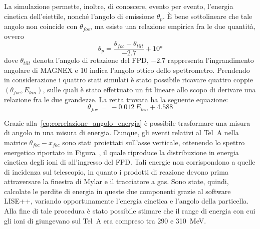 La simulazione permette, inoltre, di conoscere, evento per evento, l'energia cinetica dell'eiettile, nonché l'angolo di emissione $\theta_{p}$.
È bene sottolineare che tale angolo non coincide con $\theta_{foc}$, ma esiste una relazione empirica fra le due quantità, ovvero
\begin{equation}
	\theta_{p} = \frac{\theta_{foc} - \theta_{tilt}}{-2.7} + \ang{10}
\end{equation}
dove $\theta_{tilt}$ denota l'angolo di rotazione del FPD, $-2.7$ rappresenta l'ingrandimento angolare di MAGNEX e 10\textdegree{} indica l'angolo ottico dello spettrometro.
Prendendo in considerazione i quattro stati simulati è stato possibile ricavare quattro coppie $(\theta_{foc} , E_{kin})$, sulle quali è stato effettuato un fit lineare allo scopo di derivare una relazione fra le due grandezze.
La retta trovata ha la seguente equazione:
\begin{equation} \label{eq:correlazione_angolo_energia}
	\theta_{foc} \, = \, -0.012 \, E_{kin} + 4.588
\end{equation}

Grazie alla~\ref{eq:correlazione_angolo_energia} è possibile trasformare una misura di angolo in una misura di energia.
Dunque, gli eventi relativi al Tel~A nella matrice $\theta_{foc} - x_{foc}$ sono stati proiettati sull'asse verticale, ottenendo lo spettro energetico riportato in Figura~, il quale riproduce la distribuzione in energia cinetica degli ioni di  all'ingresso del FPD.
Tali energie non corrispondono a quelle di incidenza sul telescopio, in quanto i prodotti di reazione devono prima attraversare la finestra di Mylar e il tracciatore a gas.
Sono state, quindi, calcolate le perdite di energia in queste due componenti grazie al software LISE++, variando opportunamente l'energia cinetica e l'angolo della particella.
Alla fine di tale procedura è stato possibile stimare che il range di energia con cui gli ioni di  giungevano sul Tel~A era compreso tra 290 e 310~MeV.



\section{}

